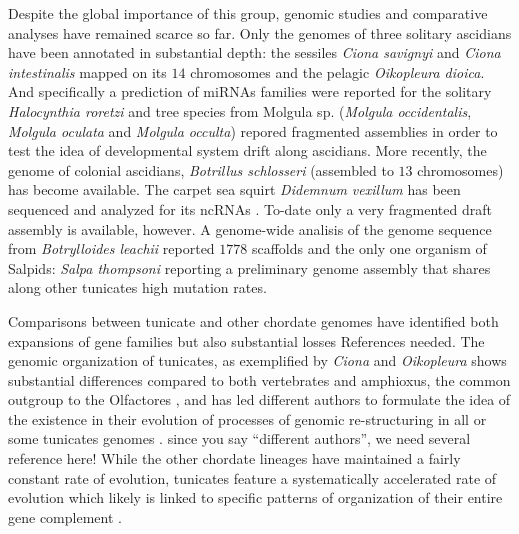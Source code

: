 \documentclass[11pt]{article}
\newcommand{\TODO}[1]{\begingroup\color{red}#1\endgroup}
\begin{document}
Despite the global importance of this group, genomic studies and
comparative analyses have remained scarce so far. Only the genomes
of three solitary ascidians have been annotated in substantial depth:
the sessiles \textit{Ciona savignyi} and \textit{Ciona intestinalis}
mapped on its $14$ chromosomes \cite{dehal2002draft, small2007haplome} and
the pelagic \textit{Oikopleura dioica}\cite{denoeud2010plasticity,seo2001miniature}. 
And specifically a prediction of miRNAs families were reported for the
solitary \textit{Halocynthia roretzi}\cite{Wang2017} and tree species 
from Molgula sp. (\textit{Molgula occidentalis}, \textit{Molgula oculata} 
and \textit{Molgula occulta})\cite{Stolfi:2014} repored fragmented assemblies
in order to test the idea of developmental system drift along ascidians.
More recently, the genome of colonial ascidians, \textit{Botrillus schlosseri} 
(assembled to $13$ chromosomes) \cite{voskoboynik2013genome} has become available.
The carpet sea squirt \textit{Didemnum vexillum} has been sequenced and
analyzed for its ncRNAs \cite{velandia2016a}. To-date only a very
fragmented draft assembly is available, however. A genome-wide
analisis of the genome sequence from \textit{Botrylloides leachii}\cite{Blanchoud2018} 
reported $1778$ scaffolds and the only one organism of Salpids: 
\textit{Salpa thompsoni}\cite{Obergfell2016} reporting a preliminary
genome assembly that shares along other tunicates high mutation rates.  

Comparisons between tunicate and other chordate genomes have identified
both expansions of gene families but also substantial losses
\TODO{References needed}. The genomic organization of tunicates, as
exemplified by \textit{Ciona} and \textit{Oikopleura} shows substantial
differences compared to both vertebrates and amphioxus, the common outgroup
to the Olfactores \cite{delsuc2006}, and has led different authors to
formulate the idea of the existence in their evolution of processes of
genomic re-structuring in all or some tunicates genomes
\cite{putnam2008amphioxus}.  \TODO{since you say ``different authors'', we
  need several reference here!}  While the other chordate lineages have
maintained a fairly constant rate of evolution, tunicates feature a
systematically accelerated rate of evolution which likely is linked to
specific patterns of organization of their entire gene complement
\cite{putnam2008amphioxus, berna2014evolutionary, Obergfell2016}.
\end{document}
